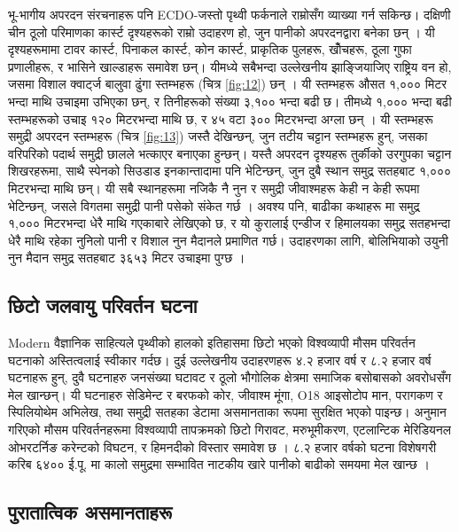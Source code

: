\documentclass[10pt,twocolumn,letterpaper]{article}
\begin{document}
भू-भागीय अपरदन संरचनाहरू पनि ECDO-जस्तो पृथ्वी फर्कनाले राम्रोसँग व्याख्या गर्न सकिन्छ। दक्षिणी चीन ठूलो परिमाणका कार्स्ट दृश्यहरूको राम्रो उदाहरण हो, जुन पानीको अपरदनद्वारा बनेका छन् \cite{82}। यी दृश्यहरूमामा टावर कार्स्ट, पिनाकल कार्स्ट, कोन कार्स्ट, प्राकृतिक पुलहरू, खोँचहरू, ठूला गुफा प्रणालीहरू, र भासिने खाल्डाहरू समावेश छन्। यीमध्ये सबैभन्दा उल्लेखनीय झाङ्जियाजिए राष्ट्रिय वन हो, जसमा विशाल क्वार्ट्ज बालुवा ढुंगा स्तम्भहरू (चित्र \ref{fig:12}) छन् \cite{84}। यी स्तम्भहरू औसत १,००० मिटर भन्दा माथि उचाइमा उभिएका छन्, र तिनीहरूको संख्या ३,१०० भन्दा बढी छ। तीमध्ये १,००० भन्दा बढी स्तम्भहरूको उचाइ १२० मिटरभन्दा माथि छ, र ४५ वटा ३०० मिटरभन्दा अग्ला छन् \cite{85}। यी स्तम्भहरू समुद्री अपरदन स्तम्भहरू (चित्र \ref{fig:13}) जस्तै देखिन्छन्, जुन तटीय चट्टान स्तम्भहरू हुन्, जसका वरिपरिको पदार्थ समुद्री छालले भत्काएर बनाएका हुन्छन्। यस्तै अपरदन दृश्यहरू तुर्कीको उरगुपका चट्टान शिखरहरूमा, साथै स्पेनको सिउडाड इनकान्तादामा पनि भेटिन्छन्, जुन दुबै स्थान समुद्र सतहबाट १,००० मिटरभन्दा माथि छन्। यी सबै स्थानहरूमा नजिकै नै नुन र समुद्री जीवाश्महरू केही न केही रूपमा भेटिन्छन्, जसले विगतमा समुद्री पानी पसेको संकेत गर्छ \cite{15,86,87}। अवश्य पनि, बाढीका कथाहरू \cite{3} मा समुद्र १,००० मिटरभन्दा धेरै माथि गएकाबारे लेखिएको छ, र यो कुरालाई एन्डीज र हिमालयका समुद्र सतहभन्दा धेरै माथि रहेका नुनिलो पानी र विशाल नुन मैदानले प्रमाणित गर्छ। उदाहरणका लागि, बोलिभियाको उयुनी नुन मैदान समुद्र सतहबाट ३६५३ मिटर उचाइमा पुग्छ \cite{94}।

\subsection{छिटो जलवायु परिवर्तन घटना}
Modern वैज्ञानिक साहित्यले पृथ्वीको हालको इतिहासमा छिटो भएको विश्वव्यापी मौसम परिवर्तन घटनाको अस्तित्वलाई स्वीकार गर्दछ। दुई उल्लेखनीय उदाहरणहरू ४.२ हजार वर्ष र ८.२ हजार वर्ष घटनाहरू हुन्, दुवै घटनाहरु जनसंख्या घटावट र ठूलो भौगोलिक क्षेत्रमा समाजिक बसोबासको अवरोधसँग मेल खान्छन्। यी घटनाहरु सेडिमेन्ट र बरफको कोर, जीवाश्म मूंगा, O18 आइसोटोप मान, परागकण र स्पिलियोथेम अभिलेख, तथा समुद्री सतहका डेटामा असमानताका रूपमा सुरक्षित भएको पाइन्छ। अनुमान गरिएको मौसम परिवर्तनहरूमा विश्वव्यापी तापक्रमको छिटो गिरावट, मरुभूमीकरण, एटलान्टिक मेरिडियनल ओभरटर्निङ करेन्टको विघटन, र हिमनदीको विस्तार समावेश छ \cite{90,91,92}। ८.२ हजार वर्षको घटना विशेषगरी करिब ६४०० ई.पू. मा कालो समुद्रमा सम्भावित नाटकीय खारे पानीको बाढीको समयमा मेल खान्छ \cite{93}।

\subsection{पुरातात्विक असमानताहरू}
\end{document}

